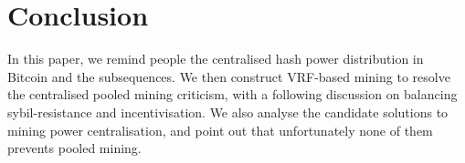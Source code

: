 \section{Conclusion}



In this paper, we remind people the centralised hash power distribution in Bitcoin and the subsequences.
We then construct VRF-based mining to resolve the centralised pooled mining criticism,
with a following discussion on balancing sybil-resistance and incentivisation.
We also analyse the candidate solutions to mining power centralisation, and point out that unfortunately none of them prevents pooled mining.